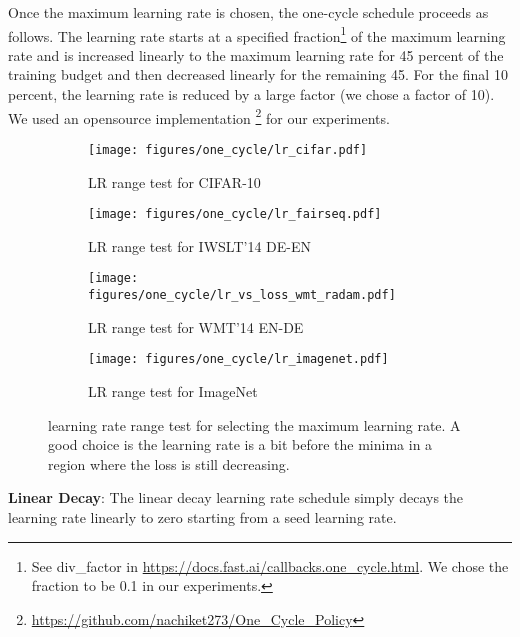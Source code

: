 \documentclass[twoside,11pt]{article}
\begin{document}
Once the maximum learning rate is chosen, the one-cycle schedule proceeds as follows. The learning rate starts at a specified fraction\footnote{See div\_factor in \url{https://docs.fast.ai/callbacks.one_cycle.html}. We chose the fraction to be 0.1 in our experiments.} of the maximum learning rate and is increased linearly to the maximum learning rate for 45 percent of the training budget and then decreased linearly for the remaining 45. For the final 10 percent, the learning rate is reduced by a large factor (we chose a factor of 10).  We used an opensource implementation \footnote{\url{https://github.com/nachiket273/One_Cycle_Policy} } for our experiments.

\begin{figure}[th]
    \centering
    \begin{subfigure}[t]{0.49\textwidth}
        \centering
        \texttt{[image: figures/one\_cycle/lr\_cifar.pdf]}
        \caption{LR range test for CIFAR-10}
        \label{fig:lr_range_test_cifar}
    \end{subfigure} \hfill
    \begin{subfigure}[t]{0.49\textwidth}
        \centering
        \texttt{[image: figures/one\_cycle/lr\_fairseq.pdf]}
        \caption{LR range test for IWSLT'14 DE-EN}
        \label{fig:lr_range_test_iwslt}
    \end{subfigure}
    \begin{subfigure}[t]{0.49\textwidth}
        \centering
        \texttt{[image: figures/one\_cycle/lr\_vs\_loss\_wmt\_radam.pdf]}
        \caption{LR range test for WMT'14 EN-DE}
        \label{fig:lr_range_test_WMT}
    \end{subfigure} \hfill
    \begin{subfigure}[t]{0.49\textwidth}
        \centering
        \texttt{[image: figures/one\_cycle/lr\_imagenet.pdf]}
        \caption{LR range test for ImageNet}
        \label{fig:lr_range_test_imagenet}
    \end{subfigure}
\caption{learning rate range test for selecting the maximum learning rate. A good choice is the learning rate is a bit before the minima in a region where the loss is still decreasing.}
\label{fig:lr_range_tests}
\end{figure}


\textbf{Linear Decay}: The linear decay learning rate schedule simply decays the learning rate linearly to zero starting from a seed learning rate.
\end{document}
